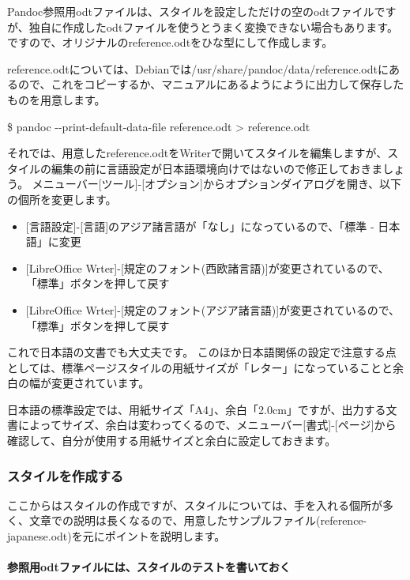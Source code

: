 \documentclass[]{article}
\providecommand{\tightlist}{%
  \setlength{\itemsep}{0pt}\setlength{\parskip}{0pt}}
\let\oldparagraph\paragraph
\renewcommand{\paragraph}[1]{\oldparagraph{#1}\mbox{}}
\begin{document}
Pandoc参照用odtファイルは、スタイルを設定しただけの空のodtファイルですが、独自に作成したodtファイルを使うとうまく変換できない場合もあります。
ですので、オリジナルのreference.odtをひな型にして作成します。

reference.odtについては、Debianでは/usr/share/pandoc/data/reference.odtにあるので、これをコピーするか、マニュアルにあるようにように出力して保存したものを用意します。

\$ pandoc -\/-print-default-data-file reference.odt \textgreater{}
reference.odt

それでは、用意したreference.odtをWriterで開いてスタイルを編集しますが、スタイルの編集の前に言語設定が日本語環境向けではないので修正しておきましょう。
メニューバー{[}ツール{]}-{[}オプション{]}からオプションダイアログを開き、以下の個所を変更します。

\begin{itemize}
\tightlist
\item
  {[}言語設定{]}-{[}言語{]}のアジア諸言語が「なし」になっているので、「標準
  - 日本語」に変更
\item
  {[}LibreOffice
  Wrter{]}-{[}規定のフォント(西欧諸言語){]}が変更されているので、「標準」ボタンを押して戻す
\item
  {[}LibreOffice
  Wrter{]}-{[}規定のフォント(アジア諸言語){]}が変更されているので、「標準」ボタンを押して戻す
\end{itemize}

これで日本語の文書でも大丈夫です。
このほか日本語関係の設定で注意する点としては、標準ページスタイルの用紙サイズが「レター」になっていることと余白の幅が変更されています。

日本語の標準設定では、用紙サイズ「A4」、余白「2.0cm」ですが、出力する文書によってサイズ、余白は変わってくるので、メニューバー{[}書式{]}-{[}ページ{]}から確認して、自分が使用する用紙サイズと余白に設定しておきます。

\subsubsection{スタイルを作成する}\label{ux30b9ux30bfux30a4ux30ebux3092ux4f5cux6210ux3059ux308b}

ここからはスタイルの作成ですが、スタイルについては、手を入れる個所が多く、文章での説明は長くなるので、用意したサンプルファイル(reference-japanese.odt)を元にポイントを説明します。

\paragraph{参照用odtファイルには、スタイルのテストを書いておく}\label{ux53c2ux7167ux7528odtux30d5ux30a1ux30a4ux30ebux306bux306fux30b9ux30bfux30a4ux30ebux306eux30c6ux30b9ux30c8ux3092ux66f8ux3044ux3066ux304aux304f}
\end{document}
